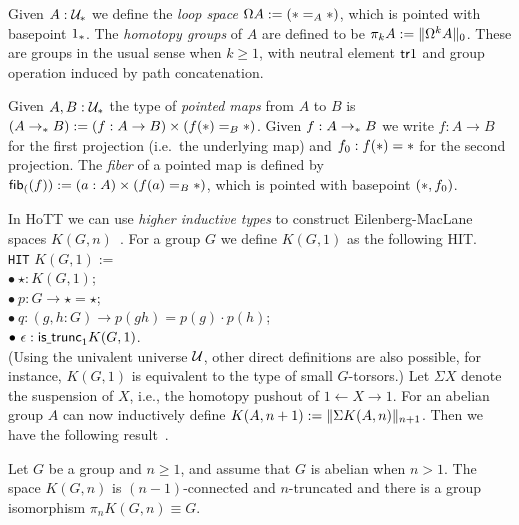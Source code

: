 Given $A:\UU_\pt$ we define the \emph{loop space} $\Omega
A:=(\pt=_A\pt)$, which is pointed with basepoint $1_\pt$. The
\emph{homotopy groups} of $A$ are defined to be $\pi_k A:=
\trunc{0}{\Omega^k A}$. These are groups in the usual sense when
$k\ge1$, with neutral element $\tr{1}$ and group
operation induced by path concatenation.

Given $A,B:\UU_\pt$ the type of \emph{pointed maps} from $A$ to $B$
is $(A\to_\pt B):=(f : A \to B)\times (f(\pt)=_B\pt)$. Given $f:A\to_\pt
B$ we write $f:A\to B$ for the first projection (i.e.~the underlying map) and $f_0:f(\pt)=\pt$ for
the second projection. The \emph{fiber} of a pointed map is defined by
$\fib(f):=(a:A)\times (f(a)=_B\pt)$, which is pointed with basepoint $(\pt,f_0)$.

In HoTT we can use \emph{higher inductive types} to construct Eilenberg-MacLane spaces $K(G,n)$~\cite{FinsterLicata}. For a group $G$ we define $K(G,1)$ as the following HIT.\\
\indent \texttt{HIT} $K(G,1) :=$ \\
\indent $\bullet\ \star : K(G,1)$; \\
\indent $\bullet\ p : G \to \star=\star$; \\
\indent $\bullet\ q : (g,h : G) \to p(gh) = p(g) \cdot p(h)$; \\
\indent $\bullet\ \epsilon : \istrunc{1}{K(G,1)}$. \\
(Using the univalent universe $\UU$, other direct definitions are
also possible, for instance, $K(G,1)$ is equivalent to the type of
small $G$-torsors.)
Let $\Sigma X$ denote the suspension of $X$, i.e., the homotopy pushout of $1\leftarrow X\to 1$. For an abelian group $A$ can now inductively define $K(A,n+1):=\trunc{n+1}{\Sigma K(A,n)}$. Then we have the following result~\cite{FinsterLicata}.

\begin{thm}\label{thm:EM-spaces}
  Let $G$ be a group and $n\geq 1$, and assume that $G$ is abelian
  when $n>1$. The space $K(G,n)$ is $(n-1)$-connected and
  $n$-truncated and there is a group isomorphism $\pi_nK(G,n) \equiv G$.
\end{thm}


